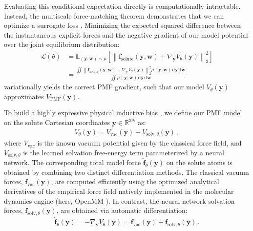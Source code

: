 Evaluating this conditional expectation directly is computationally intractable. Instead, the multiscale force-matching theorem demonstrates that we can optimize a surrogate loss \citep{noid_multiscale_2008, kalligiannaki_geometry_2015, izvekov_multiscale_2005}. Minimizing the expected squared difference between the instantaneous explicit forces and the negative gradient of our model potential over the joint equilibrium distribution:
\begin{align}
    \mathcal{L}(\theta) &= \mathbb{E}_{(\mathbf{y}, \mathbf{w}) \sim \mu} \left[ \left\lVert \mathbf{f}_{\mathrm{solute}}(\mathbf{y}, \mathbf{w}) + \nabla_{\mathbf{y}} V_{\theta}(\mathbf{y}) \right\rVert_2^2 \right] \nonumber \\
    &= \frac{\iint \left\lVert \mathbf{f}_{\mathrm{solute}}(\mathbf{y}, \mathbf{w}) + \nabla_{\mathbf{y}} V_{\theta}(\mathbf{y}) \right\rVert_2^2 \mu(\mathbf{y}, \mathbf{w}) \, \mathrm{d}\mathbf{y} \, \mathrm{d}\mathbf{w}}{\iint \mu(\mathbf{y}, \mathbf{w}) \, \mathrm{d}\mathbf{y} \, \mathrm{d}\mathbf{w}}
\end{align}
variationally yields the correct PMF gradient, such that our model $V_{\theta}(\mathbf{y})$ approximates $V_{\mathrm{PMF}}(\mathbf{y})$. 

To build a highly expressive physical inductive bias \citep{machine_learning_implicit_solvation}, we define our PMF model on the solute Cartesian coordinates $\mathbf{y} \in \mathbb{R}^{3N}$ as:
\begin{align}
    V_{\theta}(\mathbf{y}) = V_{\mathrm{vac}}(\mathbf{y}) + V_{\mathrm{solv},\theta}(\mathbf{y}) \, ,
\end{align}
where $V_{\mathrm{vac}}$ is the known vacuum potential given by the classical force field, and $V_{\mathrm{solv},\theta}$ is the learned solvation free-energy term parameterized by a neural network. The corresponding total model force $\hat{\mathbf{f}}_{\theta}(\mathbf{y})$ on the solute atoms is obtained by combining two distinct differentiation methods. The classical vacuum forces, $\mathbf{f}_{\mathrm{vac}}(\mathbf{y})$, are computed efficiently using the optimized analytical derivatives of the empirical force field natively implemented in the molecular dynamics engine (here, OpenMM \cite{eastman2023openmm}). In contrast, the neural network solvation forces, $\mathbf{f}_{\mathrm{solv},\theta}(\mathbf{y})$, are obtained via automatic differentiation:
\begin{align}
    \hat{\mathbf{f}}_{\theta}(\mathbf{y}) = -\nabla_{\mathbf{y}} V_{\theta}(\mathbf{y}) = \mathbf{f}_{\mathrm{vac}}(\mathbf{y}) + \mathbf{f}_{\mathrm{solv},\theta}(\mathbf{y}) \, .
\end{align}

